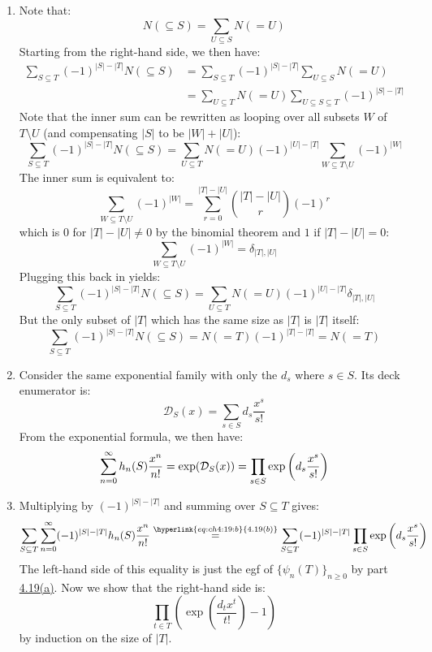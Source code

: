 \begin{solution}
    \begin{enumerate}[label=(\alph*)]
        \item \hypertarget{eq:ch4:19:a}{} Note that:
        \[
            N(\subseteq S) = \sum_{U \subseteq S} N(=U)
        \]
        Starting from the right-hand side, we then have:
        \begin{align*}
            \sum_{S\subseteq T} (-1)^{|S| - |T|} N(\subseteq S) &= \sum_{S\subseteq T} (-1)^{|S| - |T|}\sum_{U \subseteq S} N(=U) \\
            &= \sum_{U \subseteq T} N(=U)  \sum_{U\subseteq S\subseteq T}(-1)^{|S| - |T|}
        \end{align*}
        Note that the inner sum can be rewritten as looping over all subsets $W$ of $T\setminus U$ (and compensating $|S|$ to be $|W| + |U|$):
        \[
            \sum_{S\subseteq T} (-1)^{|S| - |T|} N(\subseteq S) =  \sum_{U \subseteq T} N(=U) (-1)^{|U| - |T|} \sum_{W \subseteq T \setminus U}(-1)^{|W|}
        \]
        The inner sum is equivalent to:
        \[
            \sum_{W \subseteq T \setminus U}(-1)^{|W|} = \sum_{r=0}^{|T|-|U|} \binom{|T| - |U|}{r} (-1)^r
        \]
        which is $0$ for $|T| - |U| \neq 0$ by the binomial theorem and $1$ if $|T| - |U| = 0$:
        \[
            \sum_{W \subseteq T \setminus U}(-1)^{|W|} = \delta_{|T|, |U|}
        \]
        Plugging this back in yields:
        \[
            \sum_{S\subseteq T} (-1)^{|S| - |T|} N(\subseteq S) =  \sum_{U \subseteq T} N(=U) (-1)^{|U| - |T|} \delta_{|T|, |U|}
        \]
        But the only subset of $|T|$ which has the same size as $|T|$ is $|T|$ itself:
        \[
            \sum_{S\subseteq T} (-1)^{|S| - |T|} N(\subseteq S) = N(=T)(-1)^{|T|-|T|} = N(=T)
        \]
        \item \hypertarget{eq:ch4:19:b}{} Consider the same exponential family with only the $d_s$ where $s\in S$. Its deck enumerator is:
        \[
            \mathcal{D}_S(x) = \sum_{s\in S} d_s \frac{x^s}{s!}
        \]
        From the exponential formula, we then have:
        \begin{align*}
            \bsum[n] h_n(S) \frac{x^n}{n!} = \exp(\mathcal{D}_S(x)) = \prod_{s\in S} \exp\left(d_s \frac{x^s}{s!} \right)
        \end{align*}
        \item \hypertarget{eq:ch4:19:c}{} Multiplying by $(-1)^{|S|-|T|}$ and summing over $S\subseteq T$ gives:
        \[
            \sum_{S\subseteq T}\bsum (-1)^{|S|-|T|}h_n(S) \frac{x^n}{n!} \estep{\hyperlink{eq:ch4:19:b}{4.19(b)}} \sum_{S\subseteq T} (-1)^{|S|-|T|} \prod_{s\in S} \exp\left(d_s \frac{x^s}{s!} \right)
        \]
        The left-hand side of this equality is just the egf of $\{\psi_n(T)\}_{n\geq0}$ by part \hyperlink{eq:ch4:19:a}{4.19(a)}. Now we show that the right-hand side is:
        \[
            \prod_{t\in T} \left(\exp\left(\frac{d_tx^t}{t!}\right) - 1\right)
        \]
        by induction on the size of $|T|$.


\end{enumerate}
\end{solution}
